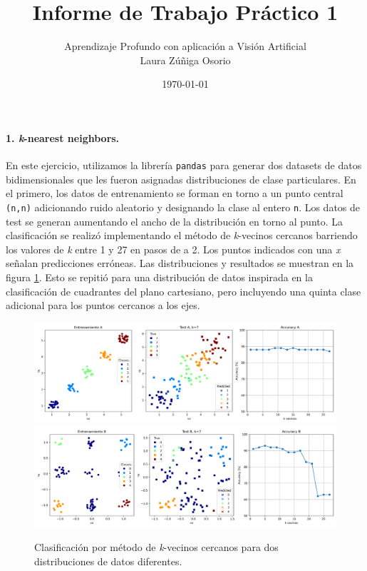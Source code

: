 \documentclass[a4paper,12pt]{article}
\title{Informe de Trabajo Práctico 1}
\author{Aprendizaje Profundo con aplicación a Visión Artificial \\
Laura Zúñiga Osorio}
\date{\today}
\begin{document}
\maketitle

\paragraph{1. \textit{k}-nearest neighbors.} En este ejercicio, utilizamos la librería \texttt{pandas} para generar dos datasets de datos bidimensionales que les fueron asignadas distribuciones de clase particulares. En el primero, los datos de entrenamiento se forman en torno a un punto central \texttt{(n,n)} adicionando ruido aleatorio y designando la clase al entero \texttt{n}. Los datos de test se generan aumentando el ancho de la distribución en torno al punto. La clasificación se realizó implementando el método de \textit{k}-vecinos cercanos barriendo los valores de \textit{k} entre 1 y 27 en pasos de a 2.  Los puntos indicados con una \textit{x} señalan predicciones erróneas. Las distribuciones y resultados se muestran en la figura \ref{fig:ej1:knn}. Esto se repitió para una distribución de datos inspirada en la clasificación de cuadrantes del plano cartesiano, pero incluyendo una quinta clase adicional para los puntos cercanos a los ejes.

\begin{figure}[!h]
    \centering
    \includegraphics[width=\textwidth]{ej1_zuniga_A.png}
    \quad
    \includegraphics[width=\textwidth]{ej1_zuniga_B.png}
    \caption{Clasificación por método de \textit{k}-vecinos cercanos para dos distribuciones de datos diferentes. \label{fig:ej1:knn}}
\end{figure}
\end{document}
